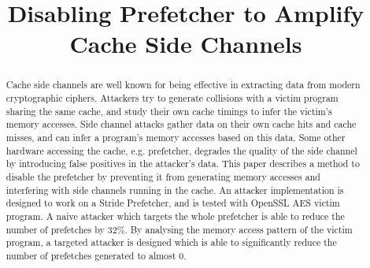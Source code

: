 \documentclass[conference]{IEEEtran}
\begin{document}
\title{Disabling Prefetcher to Amplify Cache Side Channels}


\maketitle

\begin{abstract}
Cache side channels are well known for being effective
in extracting data from modern cryptographic ciphers.
Attackers try to generate collisions with a victim program sharing
the same cache, and study their own cache timings to infer the
victim's memory accesses.
Side channel attacks gather data on their own cache hits and cache misses,
and can infer a program's memory accesses based on this data.
Some other hardware accessing the cache, e.g. prefetcher, degrades the
quality of the side channel by introducing false positives in the attacker's
data.
This paper describes a method to disable the prefetcher by preventing
it from generating memory accesses and interfering with side channels
running in the cache.
An attacker implementation is designed to work on a Stride Prefetcher,
and is tested with OpenSSL AES victim program.
A naive attacker which targets the whole prefetcher is able to reduce
the number of prefetches by 32\%. By analysing the memory access pattern of the
victim program, a targeted attacker is designed which is able to
significantly reduce the number of prefetches generated to almost 0.

\end{abstract}
\end{document}

